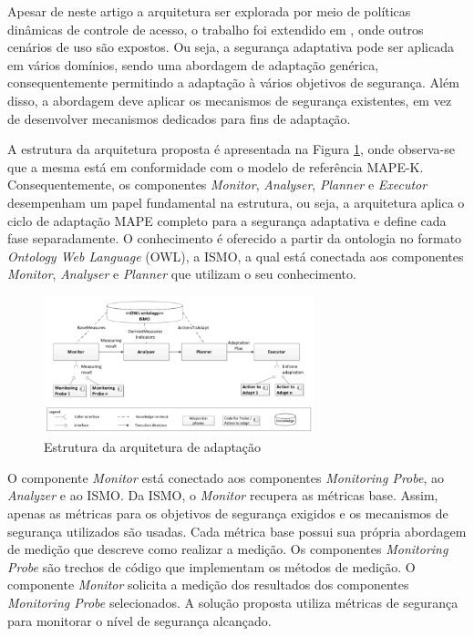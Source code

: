 \documentclass[tid,table]{texufpel} %
\begin{document}
Apesar de neste artigo a arquitetura ser explorada por meio de políticas dinâmicas de controle de acesso, o trabalho foi extendido em \cite{evesti13a}, onde outros cenários de uso são expostos. Ou seja, a segurança adaptativa pode ser aplicada em vários domínios, sendo uma abordagem de adaptação genérica, consequentemente permitindo a adaptação à vários objetivos de segurança. Além disso, a abordagem deve aplicar os mecanismos de segurança existentes, em vez de desenvolver mecanismos dedicados para fins de adaptação.

A estrutura da arquitetura proposta é apresentada na Figura \ref{ismo-architecture}, onde observa-se que a mesma está em conformidade com o modelo de referência MAPE-K. Consequentemente, os componentes \textit{Monitor}, \textit{Analyser}, \textit{Planner} e \textit{Executor} desempenham um papel fundamental na estrutura, ou seja, a arquitetura aplica o ciclo de adaptação MAPE completo para a segurança adaptativa e define cada fase separadamente. O conhecimento é oferecido a partir da ontologia no formato \textit{Ontology Web Language} (OWL), a ISMO, a qual está conectada aos componentes \textit{Monitor}, \textit{Analyser} e \textit{Planner} que utilizam o seu conhecimento.

\begin{figure}[ht]
\centering
\includegraphics[width=0.7\textwidth]{imagens/ismo-architecture.png}
\caption{Estrutura da arquitetura de adaptação}
\label{ismo-architecture}
\end{figure}

O componente \textit{Monitor} está conectado aos componentes \textit{Monitoring Probe}, ao \textit{Analyzer} e ao ISMO. Da ISMO, o \textit{Monitor} recupera as métricas base. Assim, apenas as métricas para os objetivos de segurança exigidos e os mecanismos de segurança utilizados são usadas. Cada métrica base possui sua própria abordagem de medição que descreve como realizar a medição. Os componentes \textit{Monitoring Probe} são trechos de código que implementam os métodos de medição. O componente \textit{Monitor} solicita a medição dos resultados dos componentes \textit{Monitoring Probe} selecionados. A solução proposta utiliza métricas de segurança para monitorar o nível de segurança alcançado. 
\end{document}
